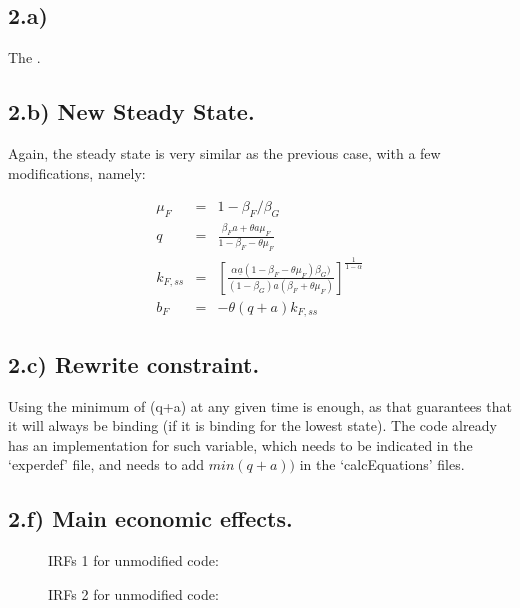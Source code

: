 \documentclass{article}
\begin{document}
\subsection*{2.a)}

The .



\subsection*{2.b) New Steady State.}

Again, the steady state is very similar as the previous case, with a few modifications, namely:

\begin{eqnarray*}
  \mu_F & = & 1-\beta_F/\beta_G  \\
  q & = & \frac{\beta_F a + \theta a\mu_F}{1-\beta_F - \theta\mu_F}   \\
  k_{F,ss} & = & \left[ \frac{\alpha \underline{a}(1-\beta_F - \theta\mu_F)\beta_G)}{(1-\beta_G) a (\beta_F + \theta \mu_F)} \right]^{\frac{1}{1-\alpha}}  \\
  b_F & = & -\theta(q + a) k_{F,ss}
\end{eqnarray*}


\subsection*{2.c) Rewrite constraint.}

Using the minimum of (q+a) at any given time is enough, as that guarantees that it will always be binding (if it is binding for the lowest state). The code already has an implementation for such variable, which needs to be indicated in the `experdef' file, and needs to add $min(q+a))$ in the `calcEquations' files.



\subsection*{2.f) Main economic effects.}



\begin{figure}
\caption{IRFs 1 for unmodified code:}
\end{figure}

\begin{figure}
\caption{IRFs 2 for unmodified code:}
\end{figure}
\end{document}
